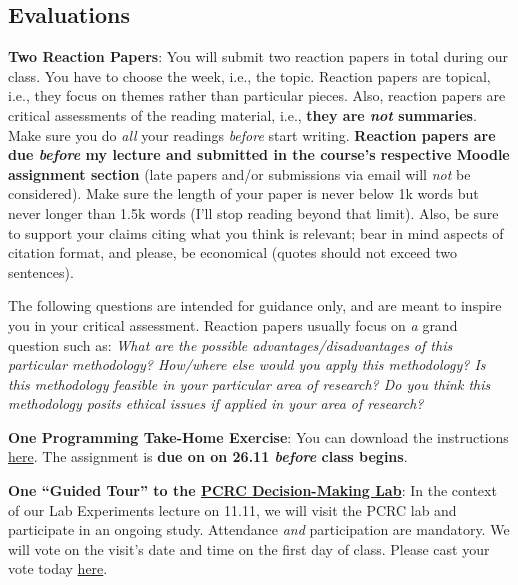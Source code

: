 \documentclass[letterpaper]{article}
\renewenvironment{itemize}{
  \begin{list}{}{
    \setlength{\leftmargin}{1.5em}
  }
}{
  \end{list}
}
\begin{document}
\subsection*{Evaluations}

\begin{enumerate}
  \item {\bf Two Reaction Papers}: You will submit two reaction papers in total during our class. You have to choose the week, i.e., the topic. Reaction papers are topical, i.e., they focus on themes rather than particular pieces. Also, reaction papers are critical assessments of the reading material, i.e., {\bf they are \emph{not} summaries}. Make sure you do \emph{all} your readings \emph{before} start writing. {\bf Reaction papers are due \emph{before} my lecture and submitted in the course's respective Moodle assignment section} (late papers and/or submissions via email will \emph{not} be considered). Make sure the length of your paper is never below 1k words but never longer than 1.5k words (I'll stop reading beyond that limit). Also, be sure to support your claims citing what you think is relevant; bear in mind aspects of citation format, and please, be economical (quotes should not exceed two sentences).

  \begin{itemize}
  \item[\Pointinghand] The following questions are intended for guidance only, and are meant to inspire you in your critical assessment. Reaction papers usually focus on \emph{a} grand question such as: \emph{What are the possible advantages/disadvantages of this particular methodology? How/where else would you apply this methodology? Is this methodology feasible in your particular area of research? Do you think this methodology posits ethical issues if applied in your area of research?}
\end{itemize}

\item {\bf One Programming Take-Home Exercise}: You can download the instructions \href{https://github.com/hbahamonde/Exp_Soc_Science/raw/main/Lectures/Labs/Conjoint/Conjoint_Lab.pdf
}{here}. The assignment is {\bf due on on 26.11 \emph{before} class begins}.

\item {\bf One ``Guided Tour'' to the \href{https://pcrclab.utu.fi/?page_id=894&lang=en}{PCRC Decision-Making Lab}}: In the context of our Lab Experiments lecture on 11.11, we will visit the PCRC lab and participate in an ongoing study. Attendance \emph{and} participation are mandatory. We will vote on the visit's date and time on the first day of class. Please cast your vote today \href{https://doodle.com/meeting/participate/id/dLn6RGAa}{here}.

  


\end{enumerate}
\end{document}

